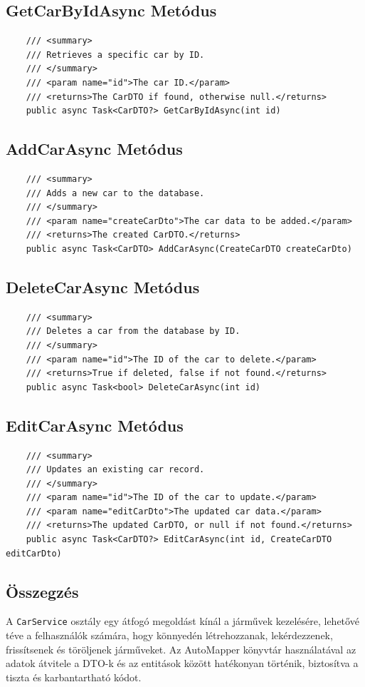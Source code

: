 \documentclass{report}[11pt]
\begin{document}
\subsection*{GetCarByIdAsync Metódus}
\begin{lstlisting}
    /// <summary>
    /// Retrieves a specific car by ID.
    /// </summary>
    /// <param name="id">The car ID.</param>
    /// <returns>The CarDTO if found, otherwise null.</returns>
    public async Task<CarDTO?> GetCarByIdAsync(int id)
\end{lstlisting}

\subsection*{AddCarAsync Metódus}
\begin{lstlisting}
    /// <summary>
    /// Adds a new car to the database.
    /// </summary>
    /// <param name="createCarDto">The car data to be added.</param>
    /// <returns>The created CarDTO.</returns>
    public async Task<CarDTO> AddCarAsync(CreateCarDTO createCarDto)
\end{lstlisting}

\subsection*{DeleteCarAsync Metódus}
\begin{lstlisting}
    /// <summary>
    /// Deletes a car from the database by ID.
    /// </summary>
    /// <param name="id">The ID of the car to delete.</param>
    /// <returns>True if deleted, false if not found.</returns>
    public async Task<bool> DeleteCarAsync(int id)
\end{lstlisting}

\subsection*{EditCarAsync Metódus}
\begin{lstlisting}
    /// <summary>
    /// Updates an existing car record.
    /// </summary>
    /// <param name="id">The ID of the car to update.</param>
    /// <param name="editCarDto">The updated car data.</param>
    /// <returns>The updated CarDTO, or null if not found.</returns>
    public async Task<CarDTO?> EditCarAsync(int id, CreateCarDTO editCarDto)
\end{lstlisting}

\subsection*{Összegzés}
A \texttt{CarService} osztály egy átfogó megoldást kínál a járművek kezelésére, lehetővé téve a felhasználók számára, hogy könnyedén létrehozzanak, lekérdezzenek, frissítsenek és töröljenek járműveket. Az AutoMapper könyvtár használatával az adatok átvitele a DTO-k és az entitások között hatékonyan történik, biztosítva a tiszta és karbantartható kódot.
\end{document}
